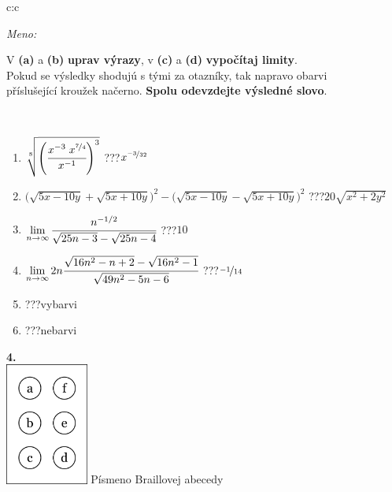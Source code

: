 \documentclass[10pt]{report}
\begin{document}
\begin{tabular}{c:c}
\begin{minipage}[c][104.5mm][t]{0.5\linewidth}
\begin{center}
\textit{Meno:}\phantom{xxxxxxxxxxxxxxxxxxxxxxxxxxxxxxxxxxxxxxxxxxxxxxxxxxxxxxxxxxxxxxxxx}\\[5mm]
\begin{minipage}{0.95\linewidth}
\begin{center}
V \textbf{(a)} a \textbf{(b)} \textbf{uprav výrazy}, v \textbf{(c)} a \textbf{(d)} \textbf{vypočítaj limity}.\\Pokud se výsledky shodujú s tými za otazníky, tak napravo obarvi\\příslušející kroužek načerno. \textbf{Spolu odevzdejte výsledné slovo}.
\end{center}
\end{minipage}
\\[1mm]
\begin{minipage}{0.79\linewidth}
\begin{center}
\begin{varwidth}{\linewidth}
\begin{enumerate}
\small
\item $\sqrt[8]{\left(\cfrac{x^{-3}\;x^{\nicefrac{7}{4}}}{x^{-1}}\right)^{3}}$\quad \dotfill\; ???\;\dotfill \quad $x^{\nicefrac{-3}{32}}$
\item {\footnotesize{\scriptsize$\big(\sqrt{5x-10y}+\sqrt{5x+10y}\big)^2-\big(\sqrt{5x-10y}-\sqrt{5x+10y}\big)^2$}\quad \dotfill\; ???\;\dotfill \quad $20\sqrt{x^2+2y^2}$}
\item $\lim\limits_{n\to\infty}\cfrac{n^{-1/2}}{\sqrt{25n-3}-\sqrt{25n-4}}$\quad \dotfill\; ???\;\dotfill \quad $10$
\item $\lim\limits_{n\to\infty}2n\cfrac{\sqrt{16n^2-n+2}-\sqrt{16n^2-1}}{\sqrt{49n^2-5n-6}}$\quad \dotfill\; ???\;\dotfill \quad $\nicefrac{-1}{14}$
\item \quad \dotfill\; ???\;\dotfill \quad vybarvi
\item \quad \dotfill\; ???\;\dotfill \quad nebarvi
\end{enumerate}
\end{varwidth}
\end{center}
\end{minipage}
\begin{minipage}{0.20\linewidth}
\begin{center}
{\Huge\bfseries 4.} \\[2mm]
\includegraphics[height=40mm]{../images/braille.png}
{\small Písmeno Braillovej abecedy}
\end{center}
\end{minipage}
\end{center}
\end{minipage}
%
\end{tabular}
\end{document}
